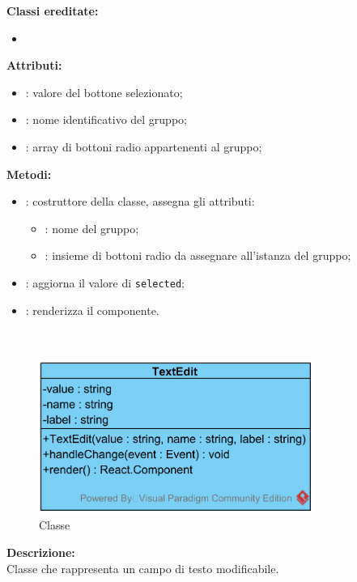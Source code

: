 \textbf{Classi ereditate:}
\begin{itemize}
	\item {}
\end{itemize}


\textbf{Attributi:}
\begin{itemize}
	\item {}: valore del bottone selezionato;
	\item {}: nome identificativo del gruppo;
	\item {}: array di bottoni radio appartenenti al gruppo;
\end{itemize}

\textbf{Metodi:}
\begin{itemize}
	\item {}: costruttore della classe, assegna gli attributi:
	\begin{itemize}
		\item {}: nome del gruppo;
		\item {}: insieme di bottoni radio da assegnare all'istanza del gruppo;
	\end{itemize}
	\item {}: aggiorna il valore di \texttt{selected};
	\item {}: renderizza il componente.
\end{itemize}


\paragraph[::TextEdit]{\class}\mbox{}\\ \label{\class}
\begin{figure}[H]
	\centering
	\includegraphics[width=9cm]{./diagrammi/framework/view/gui/textedit.png}
	\caption{Classe \class}
\end{figure}
\textbf{Descrizione:}\\
Classe che rappresenta un campo di testo modificabile.

